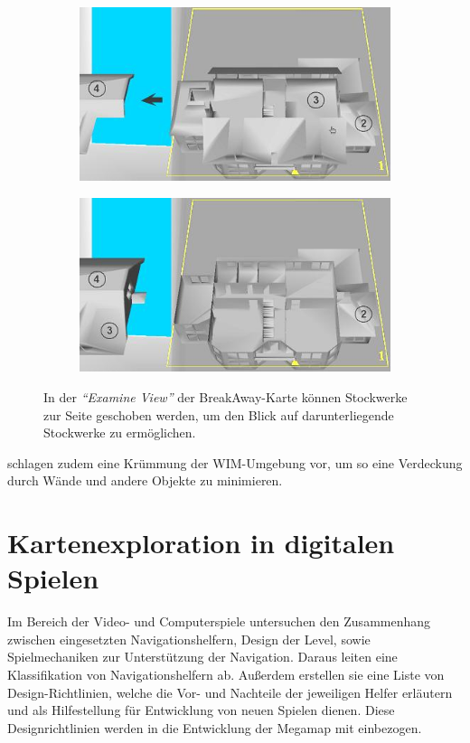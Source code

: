 \begin{figure}[b]
	\begin{subfigure}{.49\textwidth}
		\includegraphics[width=\textwidth]{figures/chittaro2005_breakaway_a.png}
	\end{subfigure}
	\hfill
	\begin{subfigure}{.49\textwidth}
		\includegraphics[width=\textwidth]{figures/chittaro2005_breakaway_b.png}
	\end{subfigure}
	\caption{In der \emph{\enquote{Examine View}} der BreakAway-Karte können Stockwerke zur Seite geschoben werden, um den Blick auf darunterliegende Stockwerke zu ermöglichen.}
	\label{fig:chittaro2005_breakaway}
\end{figure}

\textcite{Vallance2001} schlagen zudem eine Krümmung der WIM-Umgebung vor, um so eine Verdeckung durch Wände und andere Objekte zu minimieren.

\section{Kartenexploration in digitalen Spielen}
Im Bereich der Video- und Computerspiele untersuchen \textcites{Moura2014}{Moura2015} den Zusammenhang zwischen eingesetzten Navigationshelfern, Design der Level, sowie Spielmechaniken zur Unterstützung der Navigation.
Daraus leiten \textcite{Moura2015} eine Klassifikation von Navigationshelfern ab.
Außerdem erstellen sie eine Liste von Design-Richtlinien, welche die Vor- und Nachteile der jeweiligen Helfer erläutern und als Hilfestellung für Entwicklung von neuen Spielen dienen.
Diese Designrichtlinien werden in die Entwicklung der Megamap mit einbezogen.

